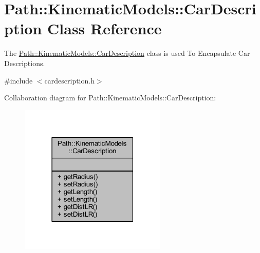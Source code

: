 \hypertarget{class_path_1_1_kinematic_models_1_1_car_description}{}\section{Path\+:\+:Kinematic\+Models\+:\+:Car\+Description Class Reference}
\label{class_path_1_1_kinematic_models_1_1_car_description}


The \hyperlink{class_path_1_1_kinematic_models_1_1_car_description}{Path\+::\+Kinematic\+Models\+::\+Car\+Description} class is used To Encapsulate Car Descriptions.  




{\ttfamily \#include $<$cardescription.\+h$>$}



Collaboration diagram for Path\+:\+:Kinematic\+Models\+:\+:Car\+Description\+:\nopagebreak
\begin{figure}[H]
\begin{center}
\leavevmode
\includegraphics[width=198pt]{de/df9/class_path_1_1_kinematic_models_1_1_car_description__coll__graph}
\end{center}
\end{figure}
